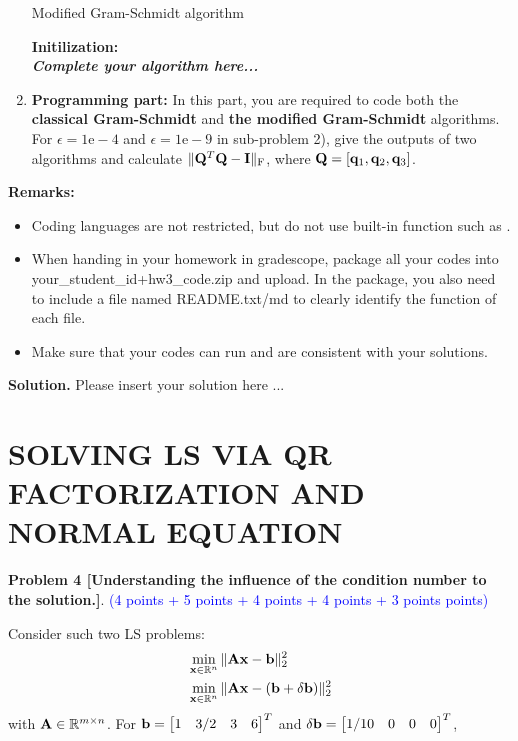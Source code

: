\documentclass[english,onecolumn]{IEEEtran}
\begin{document}
\begin{enumerate}
\begin{algorithm}[htbp]
	\label{alg:modified_gs}
\caption{Modified Gram-Schmidt algorithm}
\SetAlgoLined
{}
\textbf{Initilization:}\\
\textbf{\textit{Complete your algorithm here...}}\\
\end{algorithm}
	\item \textbf{Programming part:}
	In this part, you are required to code both the \textbf{ classical Gram-Schmidt} and \textbf{the modified Gram-Schmidt} algorithms.
	For $\epsilon=1\text{e}-4$ and $\epsilon=1\text{e}-9$ in sub-problem 2), give the outputs of two algorithms and calculate $\|{\bf Q}^T {\bf Q} - {\bf I}\|_{\text{F}}$, where ${\bf Q} = [{\bf q}_1,{\bf q}_2,{\bf q}_3]$.
\end{enumerate}
\noindent\textbf{Remarks: }
\begin{itemize}
    \item Coding languages are not restricted, but do not use built-in function such as .
    \item When handing in your homework in gradescope, package all your codes into {\sf your\_student\_id+hw3\_code.zip} and upload. In the package, you also need to include a file named {\sf README.txt/md} to clearly identify the function of each file.
     \item Make sure that your codes can run and are consistent with your solutions.
\end{itemize}

\noindent
\textbf{Solution.}
Please insert your solution here ...




\newpage
\section{SOLVING LS VIA QR FACTORIZATION AND NORMAL EQUATION}
\noindent\textbf{Problem 4 [Understanding the influence of the condition number to the solution.]}. \textcolor{blue}{(4 points + 5 points + 4 points + 4 points + 3 points points) }

Consider such two LS problems:
\begin{align}
    &\min_{{\bf x}\in\mathbb{R}^n} \|{\bf Ax - b}\|_2^2 \label{axb}\\
    &\min_{{\bf x}\in\mathbb{R}^n} \|{\bf A}{\bf x} - ({\bf b}+\delta{\bf b })\|_2^2 \nonumber%
\end{align}
with ${\bf A}\in \mathbb{R}^{m\times n}$. For ${\bf b} = \begin{bmatrix}
    1 & 3/2 & 3 & 6
    \end{bmatrix}^T$
    and 
    $\delta{\bf b} = \begin{bmatrix}
    1/10 & 0 & 0 & 0
    \end{bmatrix}^T$,
\end{document}
